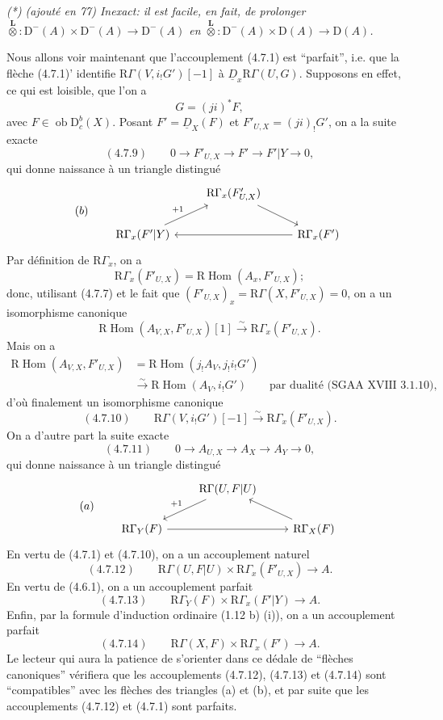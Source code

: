 \documentclass[11pt]{article}
\DeclareMathOperator{\Hom}{Hom}
\newcommand{\R}{\mathrm{R}}\newcommand{\RHomCore}{\mathrm{RHom}}
\newcommand{\D}{\mathrm{D}}
\newcommand{\ob}{\operatorname{ob}}
\providecommand{\Hom}{\operatorname{Hom}}
\providecommand{\ob}{\operatorname{ob}}
\providecommand{\R}{\mathrm R}
\providecommand{\Hom}{\operatorname{Hom}}
\begin{document}
\emph{(*) (ajouté en 77) Inexact: il est facile, en fait, de prolonger $\overset{\mathbf L}{\otimes}:\D^-(A)\times\D^-(A)\to\D^-(A)$ en $\overset{\mathbf L}{\otimes}:\D^-(A)\times\D(A)\to\D(A)$.}

Nous allons voir maintenant que l'accouplement (4.7.1) est ``parfait'', i.e. que la flèche (4.7.1)' identifie $\R\Gamma(V,i_!G')[-1]$ à $\underline{D}_x\R\Gamma(U,G)$. Supposons en effet, ce qui est loisible, que l'on a
\[
G=(ji)^*F,
\]
avec $F\in\ob\D_c^b(X)$. Posant $F'=\underline{D}_X(F)$ et $F'_{U,X}=(ji)_!G'$, on a la suite exacte
\[
(4.7.9)\qquad 0\longrightarrow F'_{U,X}\longrightarrow F'\longrightarrow F'|Y\longrightarrow0,
\]
qui donne naissance à un triangle distingué
\[
(b)\qquad
\begin{tikzcd}
& \R\Gamma_x(F'_{U,X}) \arrow[dr] \\
\R\Gamma_x(F'|Y) \arrow[ur,"{+1}"] && \R\Gamma_x(F') \arrow[ll]
\end{tikzcd}
\]
Par définition de $\R\Gamma_x$, on a
\[
\R\Gamma_x(F'_{U,X})=\R\Hom(A_x,F'_{U,X});
\]
donc, utilisant (4.7.7) et le fait que $(F'_{U,X})_x=\R\Gamma(X,F'_{U,X})=0$, on a un isomorphisme canonique
\[
\R\Hom(A_{V,X},F'_{U,X})[1]\xrightarrow{\sim}\R\Gamma_x(F'_{U,X}).
\]
Mais on a
\[
\begin{aligned}
\R\Hom(A_{V,X},F'_{U,X})&=\R\Hom(j_!A_V,j_!i_!G')\\
&\xrightarrow{\sim}\R\Hom(A_V,i_!G')\qquad\text{par dualité (SGAA~XVIII~3.1.10)},
\end{aligned}
\]
d'où finalement un isomorphisme canonique
\[
(4.7.10)\qquad \R\Gamma(V,i_!G')[-1]\xrightarrow{\sim}\R\Gamma_x(F'_{U,X}).
\]
On a d'autre part la suite exacte
\[
(4.7.11)\qquad 0\longrightarrow A_{U,X}\longrightarrow A_X\longrightarrow A_Y\longrightarrow0,
\]
qui donne naissance à un triangle distingué
\[
(a)\qquad
\begin{tikzcd}
& \R\Gamma(U,F|U) \arrow[dl,"{+1}"'] \\
\R\Gamma_Y(F) \arrow[rr] && \R\Gamma_X(F) \arrow[ul]
\end{tikzcd}
\]
En vertu de (4.7.1) et (4.7.10), on a un accouplement naturel
\[
(4.7.12)\qquad \R\Gamma(U,F|U)\times\R\Gamma_x(F'_{U,X})\longrightarrow A.
\]
En vertu de (4.6.1), on a un accouplement parfait
\[
(4.7.13)\qquad \R\Gamma_Y(F)\times\R\Gamma_x(F'|Y)\longrightarrow A.
\]
Enfin, par la formule d'induction ordinaire (1.12 b) (i)), on a un accouplement parfait
\[
(4.7.14)\qquad \R\Gamma(X,F)\times\R\Gamma_x(F')\longrightarrow A.
\]
Le lecteur qui aura la patience de s'orienter dans ce dédale de ``flèches canoniques'' vérifiera que les accouplements (4.7.12), (4.7.13) et (4.7.14) sont ``compatibles'' avec les flèches des triangles (a) et (b), et par suite que les accouplements (4.7.12) et (4.7.1) sont parfaits.
\end{document}
